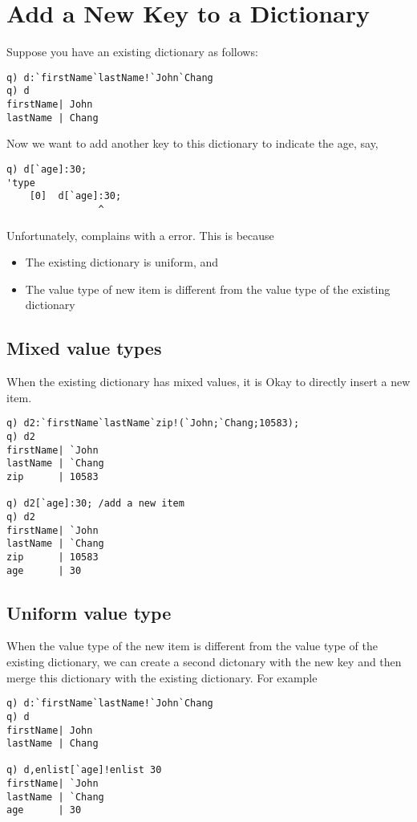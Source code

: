 \section{Add a New Key to a Dictionary}

Suppose you have an existing dictionary  as follows:

\begin{verbatim}
q) d:`firstName`lastName!`John`Chang
q) d
firstName| John
lastName | Chang
\end{verbatim}

Now we want to add another key to this dictionary to indicate the age, say, 
\begin{verbatim}
q) d[`age]:30;
'type
    [0]  d[`age]:30;
                ^
\end{verbatim}
Unfortunately,  complains with a  error. This is because
\begin{itemize}
\item The existing dictionary is uniform, and
\item The value type of new item is different from the value type of the existing dictionary
\end{itemize}


\subsection{Mixed value types}
When the existing dictionary has mixed values, it is Okay to directly insert a new item.

\begin{verbatim}
q) d2:`firstName`lastName`zip!(`John;`Chang;10583);
q) d2
firstName| `John
lastName | `Chang
zip      | 10583

q) d2[`age]:30; /add a new item
q) d2
firstName| `John
lastName | `Chang
zip      | 10583
age      | 30
\end{verbatim}


\subsection{Uniform value type}
When the value type of the new item is different from the value type of the existing dictionary, we can create a second dictonary with the new key and then merge this dictionary with the existing dictionary. For example

\begin{verbatim}
q) d:`firstName`lastName!`John`Chang
q) d
firstName| John
lastName | Chang

q) d,enlist[`age]!enlist 30
firstName| `John
lastName | `Chang
age      | 30
\end{verbatim}


